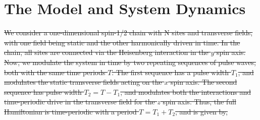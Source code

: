 \documentclass[
nofootinbib,
reprint,
superscriptaddress,
amsmath,amssymb,showkeys,
aps,
prb,
]{revtex4-2}
\begin{document}
	
	\section{\label{sec:mdl_n_dynam} The Model and System Dynamics}
	
	\sout{We consider a one-dimensional spin-1/2 chain with N sites and transverse fields, with one field being static and the other harmonically driven in time. In the chain, all sites are connected via the Heisenberg interaction in the $y$ spin axis. Now, we modulate the system in time by two repeating sequences of pulse waves, both with the same time periods $T$.  The first sequence has a pulse width $T_1$, and modulates the static transverse fields acting on the $x$ spin axis. The second  sequence has pulse width $T_2=T-T_1$, and modulates  both the interactions and  time-periodic drive in the transverse field for the $z$ spin axis. Thus, the full Hamiltonian is time-periodic with a period $T=T_1+T_2$, and is given by,}
	
\end{document}
